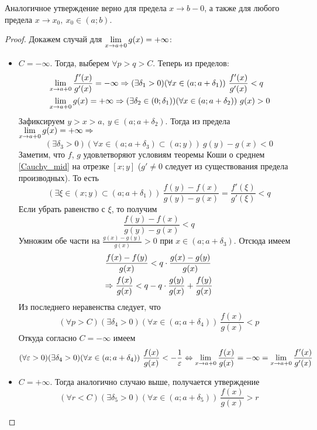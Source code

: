 \begin{note}
	Аналогичное утверждение верно для предела $x \to b-0$,
	а также для любого предела $x \to x_0,\ x_0 \in (a; b)$.
\end{note}

\begin{proof}
	Докажем случай для $\lim\limits_{x \to a + 0} g(x) = +\infty$:
	\begin{itemize}
		\item $C = -\infty$. Тогда, выберем $\forall p > q > C$.
		Теперь из пределов:
		\begin{align*}
			&\lim\limits_{x \to a + 0} \frac{f'(x)}{g'(x)} = -\infty \Rightarrow
			(\exists \delta_1 > 0)(\forall x \in
			(a; a + \delta_1))\ \frac{f'(x)}{g'(x)} < q
			\\
			&\lim\limits_{x \to a + 0} g(x) = +\infty \Rightarrow 
			(\exists \delta_2 \in (0; \delta_1))
			(\forall x \in (a; a + \delta_2))\ g(x) > 0
		\end{align*}
		Зафиксируем $y > x > a,\ y \in (a; a + \delta_2)$. Тогда из
		предела $\lim\limits_{x \to a + 0} g(x) = +\infty \Rightarrow$
		\[
			(\exists \delta_3 > 0)(\forall x \in
			(a; a + \delta_3) \subset (a; y))\ g(y) - g(x) < 0
		\]
		Заметим, что $f$, $g$ удовлетворяют условиям теоремы
		Коши о среднем \ref{Cauchy_mid} на отрезке $[x; y]$ ($g' \neq 0$
		следует из существования предела производных). То есть
		\[
			\left(\exists \xi \in (x; y) \subset (a; a + \delta_1)\right)
			\ \frac{f(y) - f(x)}{g(y) - g(x)} =
			\frac{f'(\xi)}{g'(\xi)} < q
		\]
		Если убрать равенство с $\xi$, то получим
		\[
			\frac{f(y) - f(x)}{g(y) - g(x)} < q
		\]
		Умножим обе части на $\frac{g(x) - g(y)}{g(x)} > 0$
		при $x \in (a; a + \delta_3)$. Отсюда имеем
		\begin{align*}
			&{\frac{f(x) - f(y)}{g(x)} < q \cdot
			\frac{g(x) - g(y)}{g(x)}}
			\\
			&{\Rightarrow \frac{f(x)}{g(x)} < q - q \cdot
			\frac{g(y)}{g(x)} + \frac{f(y)}{g(x)}}
		\end{align*}
		Из последнего неравенства следует, что
		\[
			(\forall p > C)(\exists \delta_4 > 0)
			(\forall x \in (a; a + \delta_4))\ \frac{f(x)}{g(x)} < p
		\]
		Откуда согласно $C = -\infty$ имеем
		\[
			(\forall \eps > 0)(\exists \delta_4 > 0)
			(\forall x \in (a; a + \delta_4))\ 
			\frac{f(x)}{g(x)} < -\frac{1}{\eps} \lra 
			\liml_{x \to a + 0} \frac{f(x)}{g(x)} = -\infty =
			\liml_{x \to a + 0} \frac{f'(x)}{g'(x)}
		\]
		
		\item $C = +\infty$. Тогда аналогично случаю выше,
		получается утверждение
		\[
			(\forall r < C)(\exists \delta_5 > 0)
			(\forall x \in (a; a + \delta_5))\ 
			\frac{f(x)}{g(x)} > r
		\]
		

\end{itemize}
\end{proof}
